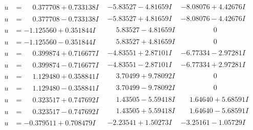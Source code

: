\documentclass[1p]{elsarticle_modified}
\theoremstyle{definition}
\begin{document}
$$\begin{array}{c|c|c}
\begin{aligned}
u &= \phantom{-}0.377708 + 0.733138 I\end{aligned}
 & -5.83527 - 4.81659 I & -8.08076 + 4.42676 I \\ \hline\begin{aligned}
u &= \phantom{-}0.377708 - 0.733138 I\end{aligned}
 & -5.83527 + 4.81659 I & -8.08076 - 4.42676 I \\ \hline\begin{aligned}
u &= -1.125560 + 0.351844 I\end{aligned}
 & \phantom{-}5.83527 - 4.81659 I & \phantom{-0.000000 } 0 \\ \hline\begin{aligned}
u &= -1.125560 - 0.351844 I\end{aligned}
 & \phantom{-}5.83527 + 4.81659 I & \phantom{-0.000000 } 0 \\ \hline\begin{aligned}
u &= \phantom{-}0.399874 + 0.716677 I\end{aligned}
 & -4.83551 + 2.87101 I & -6.77334 - 2.97281 I \\ \hline\begin{aligned}
u &= \phantom{-}0.399874 - 0.716677 I\end{aligned}
 & -4.83551 - 2.87101 I & -6.77334 + 2.97281 I \\ \hline\begin{aligned}
u &= \phantom{-}1.129480 + 0.358841 I\end{aligned}
 & \phantom{-}3.70499 + 9.78092 I & \phantom{-0.000000 } 0 \\ \hline\begin{aligned}
u &= \phantom{-}1.129480 - 0.358841 I\end{aligned}
 & \phantom{-}3.70499 - 9.78092 I & \phantom{-0.000000 } 0 \\ \hline\begin{aligned}
u &= \phantom{-}0.323517 + 0.747692 I\end{aligned}
 & \phantom{-}1.43505 - 5.59418 I & \phantom{-}1.64640 + 5.68591 I \\ \hline\begin{aligned}
u &= \phantom{-}0.323517 - 0.747692 I\end{aligned}
 & \phantom{-}1.43505 + 5.59418 I & \phantom{-}1.64640 - 5.68591 I \\ \hline\begin{aligned}
u &= -0.379511 + 0.708479 I\end{aligned}
 & -2.23541 + 1.50273 I & -3.25161 - 1.05729 I \\ \hline\begin{aligned}

\end{aligned}
\end{array}$$
\end{document}
